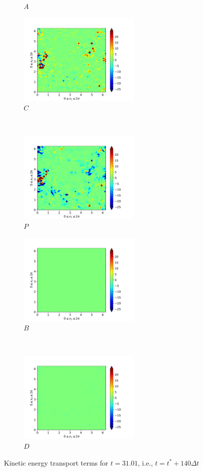 \begin{figure}[H]
\begin{subfigure}{0.45\textwidth}
        \caption{$A$}
    \end{subfigure}
    \newline
    \begin{subfigure}{0.45\textwidth}
        \includegraphics[height=1.75in]{media/run-cds-65/C-ke-1480}
        \caption{$C$}
    \end{subfigure}
    ~
    \begin{subfigure}{0.45\textwidth}
        \includegraphics[height=1.75in]{media/run-cds-65/P-ke-1480}
        \caption{$P$}
    \end{subfigure}
    \newline
    \begin{subfigure}{0.45\textwidth}
        \includegraphics[height=1.75in]{media/run-cds-65/B-ke-1480}
        \caption{$B$}
    \end{subfigure}
    ~
    \begin{subfigure}{0.45\textwidth}
        \includegraphics[height=1.75in]{media/run-cds-65/D-ke-1480}
        \caption{$D$}
    \end{subfigure}
    \caption{Kinetic energy transport terms for $t=31.01$, i.e., $t=t^{\ast} + 140 \Delta t$}
\end{figure}
